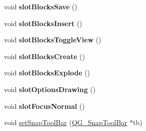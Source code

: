 \begin{DoxyCompactItemize}
\item 
\hypertarget{classQG__ActionHandler_a5ec96b600930268a4ac5417757e5c87a}{void {\bfseries slot\-Blocks\-Save} ()}\label{classQG__ActionHandler_a5ec96b600930268a4ac5417757e5c87a}

\item 
\hypertarget{classQG__ActionHandler_ae31e880a351cd715f116c2580675ac33}{void {\bfseries slot\-Blocks\-Insert} ()}\label{classQG__ActionHandler_ae31e880a351cd715f116c2580675ac33}

\item 
\hypertarget{classQG__ActionHandler_a6e32a077ee7bad32198ac8afcf487a60}{void {\bfseries slot\-Blocks\-Toggle\-View} ()}\label{classQG__ActionHandler_a6e32a077ee7bad32198ac8afcf487a60}

\item 
\hypertarget{classQG__ActionHandler_ab3067436b411decf5e00f049ad5ce8b5}{void {\bfseries slot\-Blocks\-Create} ()}\label{classQG__ActionHandler_ab3067436b411decf5e00f049ad5ce8b5}

\item 
\hypertarget{classQG__ActionHandler_a527157f6a7a4224f4b02550fed412f33}{void {\bfseries slot\-Blocks\-Explode} ()}\label{classQG__ActionHandler_a527157f6a7a4224f4b02550fed412f33}

\item 
\hypertarget{classQG__ActionHandler_a742f538097c49628d5952fa85a893e59}{void {\bfseries slot\-Options\-Drawing} ()}\label{classQG__ActionHandler_a742f538097c49628d5952fa85a893e59}

\item 
\hypertarget{classQG__ActionHandler_a4d9bac1549276c00ef079e5911d57ab0}{void {\bfseries slot\-Focus\-Normal} ()}\label{classQG__ActionHandler_a4d9bac1549276c00ef079e5911d57ab0}

\item 
void \hyperlink{classQG__ActionHandler_ae86213045e0797659af060d61d6f428f}{set\-Snap\-Tool\-Bar} (\hyperlink{classQG__SnapToolBar}{Q\-G\-\_\-\-Snap\-Tool\-Bar} $\ast$tb)
\end{DoxyCompactItemize}
